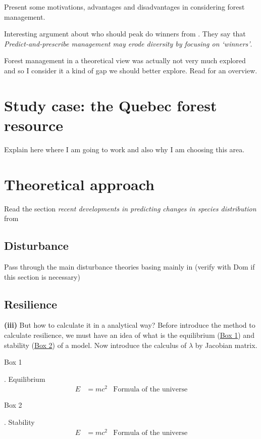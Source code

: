 Present some motivations, advantages and disadvantages in considering forest management.

Interesting argument about who should peak do winners from \citet{Webster2017}. They say that \textit{Predict-and-prescribe management may erode diversity by focusing on ‘winners’}.

Forest management in a theoretical view was actually not very much explored and so I consider it a kind of gap we should better explore. Read \citet{Becknell2015} for an overview.

\section{Study case: the Quebec forest resource}

Explain here where I am going to work and also why I am choosing this area.

\section{Theoretical approach}

Read the section \textit{recent developments in predicting changes in species distribution} from \citet{Ehrlen2015}

\subsection*{Disturbance}
Pass through the main disturbance theories basing mainly in \citet{Pulsford2016} (verify with Dom if this section is necessary)

\subsection*{Resilience}
\textbf{(iii)} But how to calculate it in a analytical way? Before introduce the method to calculate resilience, we must have an idea of what is the equilibrium (\hyperlink{box1}{Box 1}) and stability (\hyperlink{box2}{Box 2}) of a model. Now introduce the calculus of $\lambda$ by Jacobian matrix.

\begin{tcolorbox}
\hypertarget{box1}{Box 1}. Equilibrium
\begin{align}
E &= mc^2 & \text{Formula of the universe}
\end{align}
\end{tcolorbox}

\begin{tcolorbox}
\hypertarget{box2}{Box 2}. Stability
\begin{align}
E &= mc^2 & \text{Formula of the universe}
\end{align}
\end{tcolorbox}

